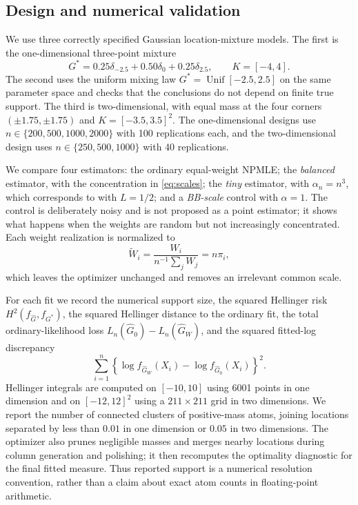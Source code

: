 \documentclass[11pt]{article}
\theoremstyle{definition}
\theoremstyle{remark}
\begin{document}
\subsection{Design and numerical validation}

We use three correctly specified Gaussian location-mixture models.  The first
is the one-dimensional three-point mixture
\[
 G^*=0.25\delta_{-2.5}+0.50\delta_0+0.25\delta_{2.5},
 \qquad K=[-4,4].
\]
The second uses the uniform mixing law $G^*=\operatorname{Unif}[-2.5,2.5]$ on
the same parameter space and checks that the conclusions do not depend on
finite true support.  The third is two-dimensional, with equal mass at the
four corners $(\pm1.75,\pm1.75)$ and $K=[-3.5,3.5]^2$.  The one-dimensional
designs use $n\in\{200,500,1000,2000\}$ with 100 replications each, and the
two-dimensional design uses $n\in\{250,500,1000\}$ with 40 replications.

We compare four estimators: the ordinary equal-weight NPMLE; the
\emph{balanced} estimator, with the concentration in \eqref{eq:scales}; the
\emph{tiny} estimator, with $\alpha_n=n^3$, which corresponds to
 with $L=1/2$; and a \emph{BB-scale} control with $\alpha=1$.
The control is deliberately noisy and is not proposed as a point estimator;
it shows what happens when the weights are random but not increasingly
concentrated.  Each weight realization is normalized to
\[
 \widetilde W_i=\frac{W_i}{n^{-1}\sum_jW_j}=n\pi_i,
\]
which leaves the optimizer unchanged and removes an irrelevant common scale.

For each fit we record the numerical support size, the squared Hellinger risk
$H^2(f_{\widehat G},f_{G^*})$, the squared Hellinger distance to the ordinary
fit, the total ordinary-likelihood loss
$L_n(\widehat G_0)-L_n(\widehat G_W)$, and the squared fitted-log
discrepancy
\[
 \sum_{i=1}^n\left\{
 \log f_{\widehat G_W}(X_i)-\log f_{\widehat G_0}(X_i)
 \right\}^2.
\]
Hellinger integrals are computed on $[-10,10]$ using 6001 points in one
dimension and on $[-12,12]^2$ using a $211\times211$ grid in two dimensions.
We report the number of connected clusters of positive-mass atoms, joining
locations separated by less than $0.01$ in one dimension or $0.05$ in two
dimensions.  The optimizer also prunes negligible masses and merges nearby
locations during column generation and polishing; it then recomputes the
optimality diagnostic for the final fitted measure.  Thus reported support
is a numerical resolution convention, rather than a claim about exact atom
counts in floating-point arithmetic.
\end{document}
